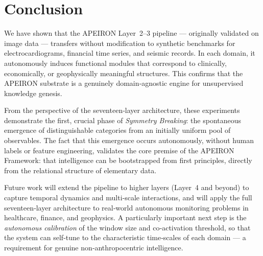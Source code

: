 \section{Conclusion}\label{sec:concl}
We have shown that the APEIRON Layer~2--3 pipeline — originally validated on image data — transfers without modification to synthetic benchmarks for electrocardiograms, financial time series, and seismic records.
In each domain, it autonomously induces functional modules that correspond to clinically, economically, or geophysically meaningful structures.
This confirms that the APEIRON substrate is a genuinely domain‑agnostic engine for unsupervised knowledge genesis.

From the perspective of the seventeen‑layer architecture, these experiments demonstrate the first, crucial phase of \emph{Symmetry Breaking}: the spontaneous emergence of distinguishable categories from an initially uniform pool of observables.
The fact that this emergence occurs autonomously, without human labels or feature engineering, validates the core premise of the APEIRON Framework: that intelligence can be bootstrapped from first principles, directly from the relational structure of elementary data.

Future work will extend the pipeline to higher layers (Layer~4 and beyond) to capture temporal dynamics and multi‑scale interactions, and will apply the full seventeen‑layer architecture to real‑world autonomous monitoring problems in healthcare, finance, and geophysics.
A particularly important next step is the \emph{autonomous calibration} of the window size and co‑activation threshold, so that the system can self‑tune to the characteristic time‑scales of each domain — a requirement for genuine non‑anthropocentric intelligence.